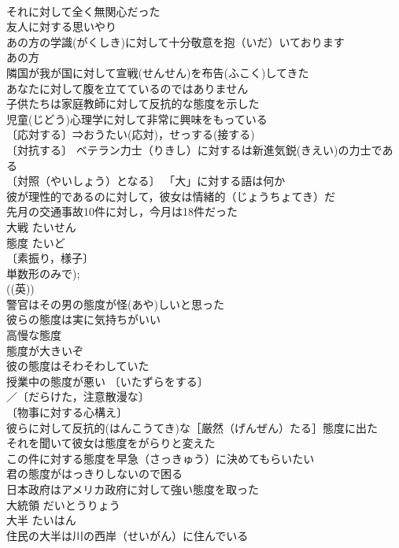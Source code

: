 \documentclass[8pt]{extreport}
\begin{document}
\begin{CJK}{UTF8}{min}
\\	それに対して全く無関心だった 
\\	友人に対する思いやり 
\\	あの方の学識(がくしき)に対して十分敬意を抱（いだ）いております 
\\	あの方　
\\	隣国が我が国に対して宣戦(せんせん)を布告(ふこく)してきた 
\\	あなたに対して腹を立てているのではありません 
\\	子供たちは家庭教師に対して反抗的な態度を示した 
\\	児童(じどう)心理学に対して非常に興味をもっている 
\\	〔応対する〕⇒おうたい(応対)，せっする(接する)
\\	〔対抗する〕 ベテラン力士（りきし）に対するは新進気鋭(きえい)の力士である 
\\	〔対照（やいしょう）となる〕 「大」に対する語は何か 
\\	彼が理性的であるのに対して，彼女は情緒的（じょうちょてき）だ 
\\	先月の交通事故10件に対し，今月は18件だった 
\\	大戦	たいせん	
\\	態度	たいど	
\\	〔素振り，様子〕
\\	単数形のみで); 
\\	((英)) 
\\	警官はその男の態度が怪(あや)しいと思った 
\\	彼らの態度は実に気持ちがいい 
\\	高慢な態度 
\\	態度が大きいぞ 
\\	彼の態度はそわそわしていた 
\\	授業中の態度が悪い 〔いたずらをする〕
\\	／〔だらけた，注意散漫な〕
\\	〔物事に対する心構え〕
\\	彼らに対して反抗的(はんこうてき)な［厳然（げんぜん）たる］態度に出た 
\\	それを聞いて彼女は態度をがらりと変えた 
\\	この件に対する態度を早急（さっきゅう）に決めてもらいたい 
\\	君の態度がはっきりしないので困る 
\\	日本政府はアメリカ政府に対して強い態度を取った 
\\	大統領	だいとうりょう	
\\	大半	たいはん	
\\	住民の大半は川の西岸（せいがん）に住んでいる 

\end{CJK}
\end{document}
